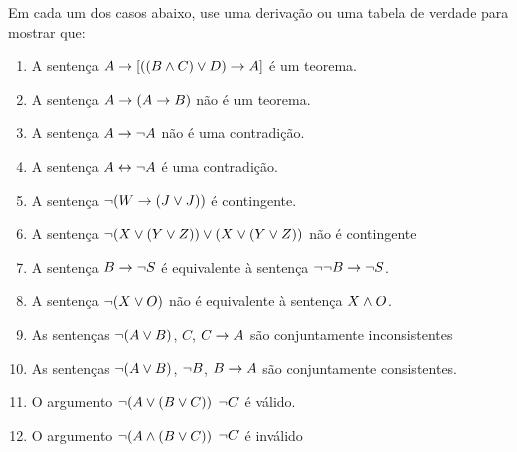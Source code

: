  
\practiceproblems
\noindent\problempart Em cada um dos casos abaixo, use uma  deriva\c c\~ao ou uma tabela de verdade para mostrar que: 
\begin{enumerate}%
\item  A senten\c ca $A \rightarrow [((B \wedge C) \vee D) \rightarrow A]$  \'e um teorema.
\item  A senten\c ca $A \rightarrow (A \rightarrow B)$  n\~ao \'e um teorema.
\item  A senten\c ca $A \rightarrow \neg{A}$ n\~ao \'e uma contradi\c c\~ao. 
\item  A senten\c ca $A \leftrightarrow \neg A$ \'e uma contradi\c c\~ao.  

\item  A senten\c ca $ \neg (W \rightarrow (J \vee J)) $  \'e contingente.
\item  A senten\c ca $ \neg(X \vee (Y \vee Z)) \vee (X \vee (Y \vee Z))$  n\~ao \'e contingente
 \item  A senten\c ca $B \rightarrow \neg S$  \'e equivalente \`a senten\c ca $\neg \neg B \rightarrow \neg S$.
\item  A senten\c ca $ \neg (X \vee O) $ n\~ao \'e equivalente \`a senten\c ca $X \wedge O$.
\item  As senten\c cas $\neg(A \vee B)$, $C$, $C \rightarrow A$  s\~ao conjuntamente inconsistentes
\item  As senten\c cas $\neg(A \vee B)$, $\neg{B}$, $B \rightarrow A$ s\~ao conjuntamente consistentes.
\item  O argumento $\neg(A \vee (B \vee C)) $ \therefore $ \neg{C}$ \'e v\'alido.
\item  O argumento $\neg(A \wedge (B \vee C))$ \therefore $ \neg{C}$ \'e  inv\'alido
\end{enumerate}


